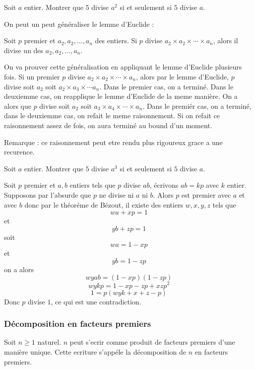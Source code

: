 \exo
Soit \(a\) entier.
Montrer que \(5\) divise \(a^2\) si et seulement si \(5\) divise \(a\).

On peut un peut généraliser le lemme d'Euclide :


Soit \(p\) premier et \(a_2 , a_2 , \ldots , a_{n}\) des entiers. Si \(p\) divise \(a_2 \times a_2 \times \cdots \times a_{n}\), alors il divise un des \(a_2 , a_2 , \ldots , a_{n}\).

\endgroup

\preuve

On va prouver cette généralisation en appliquant le lemme d'Euclide plusieurs fois.
Si un premier \(p\) divise \(a_2 \times a_2 \times \cdots \times a_{n}\), alors par le lemme d'Euclide, \(p\) divise soit \(a_2\) soit \(a_2 \times a_{3} \times \cdots a_{n}\). Dans le premier cas, on a terminé. Dans le deuxiemme cas, on reapplique le lemme d'Euclide de la meme manière. On a alors que \(p\) divise soit \(a_2\) soit \(a_{3} \times a_{4} \times \cdots \times a_{n}\). Dans le premiér cas, on a terminé, dans le deuxiemme cas, on refait le meme raisonnement. Si on refait ce raisonnement assez de fois, on aura terminé au bound d'un moment.

Remarque : ce raisonnement peut etre rendu plus rigoureux grace a une recurence.

\exo
Soit \(a\) entier.
Montrer que \(5\) divise \(a^{3}\) si et seulement si \(5\) divise \(a\).


Soit \(p\) premier et \(a, b\) entiers tels que \(p\) divise \(ab\), écrivons \(ab = kp\) avec \(k\) entier. Supposons par l'absurde que \(p\) ne divise ni \(a\) ni \(b\). Alors \(p\) est premier avec \(a\) et avec \(b\) donc par le théoréme de Bézout, il existe des entiers \(w, x, y, z\) tels que
\[wa + xp = 1\]
et
\[yb + zp = 1\]
soit
\[wa = 1 - xp\]
et
\[yb = 1 - zp\]
on a alors
\[wyab = \left(1 - xp\right)\left(1 - zp\right)\]
\[wykp = 1 - xp - zp + xzp^2\]
\[1 = p\left(wyk + x + z - p\right)\]
Donc \(p\) divise \(1\), ce qui est une contradiction.

\subsubsection{Décomposition en facteurs premiers}
Soit \(n\geqslant1\) naturel. \(n\) peut s'ecrir comme produit de facteurs premiers d'une manière unique. Cette ecriture s'appéle la décomposition de \(n\) en facteurs premiers.


